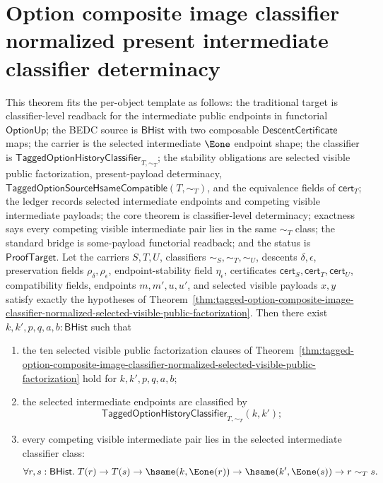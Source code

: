 \section{Option composite image classifier normalized present intermediate classifier determinacy}
\label{sec:option-composite-image-classifier-normalized-present-intermediate-classifier-determinacy}

\begin{theorem}
\label{thm:tagged-option-composite-image-classifier-normalized-present-intermediate-classifier-determinacy}
This theorem fits the per-object template as follows: the traditional target is
classifier-level readback for the intermediate public endpoints in functorial
$\mathsf{OptionUp}$; the BEDC source is $\mathsf{BHist}$ with two composable
$\mathsf{DescentCertificate}$ maps; the carrier is the selected intermediate
$\Eone$ endpoint shape; the classifier is
$\mathsf{TaggedOptionHistoryClassifier}_{T,\sim_T}$; the stability obligations
are selected visible public factorization, present-payload determinacy,
$\mathsf{TaggedOptionSourceHsameCompatible}(T,\sim_T)$, and the equivalence
fields of $\mathsf{cert}_T$; the ledger records selected intermediate endpoints
and competing visible intermediate payloads; the core theorem is
classifier-level determinacy; exactness says every competing visible
intermediate pair lies in the same $\sim_T$ class; the standard bridge is
some-payload functorial readback; and the status is $\mathsf{ProofTarget}$. Let
the carriers $S,T,U$, classifiers $\sim_S,\sim_T,\sim_U$, descents
$\delta,\epsilon$, preservation fields $\rho_{\delta},\rho_{\epsilon}$,
endpoint-stability field $\eta_{\epsilon}$, certificates
$\mathsf{cert}_S,\mathsf{cert}_T,\mathsf{cert}_U$, compatibility fields,
endpoints $m,m',u,u'$, and selected visible payloads $x,y$ satisfy exactly the
hypotheses of
Theorem~\ref{thm:tagged-option-composite-image-classifier-normalized-selected-visible-public-factorization}.
Then there exist $k,k',p,q,a,b:\mathsf{BHist}$ such that
\begin{enumerate}
\item the ten selected visible public factorization clauses of
Theorem~\ref{thm:tagged-option-composite-image-classifier-normalized-selected-visible-public-factorization}
hold for $k,k',p,q,a,b$;
\item the selected intermediate endpoints are classified by
$$
\mathsf{TaggedOptionHistoryClassifier}_{T,\sim_T}(k,k');
$$
\item every competing visible intermediate pair lies in the selected
intermediate classifier class:
$$
\forall r,s:\mathsf{BHist}.\;
T(r)\to T(s)\to
\hsame(k,\Eone(r))\to \hsame(k',\Eone(s))\to r\sim_T s.
$$
\end{enumerate}
\end{theorem}

